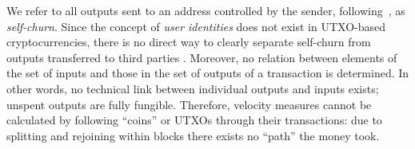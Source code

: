 We refer to all outputs sent to an address controlled by the sender,
following~\cite{kalodner2017blocksci}, as \emph{self-churn}. %
Since the concept of \textit{user identities} does not exist in UTXO-based
cryptocurrencies, there is no direct way to clearly separate self-churn from
outputs transferred to third parties \citep[cf.][]{meiklejohn2013fistful}. %
Moreover, no relation between elements of the set of inputs and those in the
set of outputs of a transaction is determined. %
In other words, no technical link between individual outputs and inputs
exists; unspent outputs are fully fungible. %
Therefore, velocity measures cannot be calculated by following ``coins'' or
UTXOs through their transactions: due to splitting and rejoining within
blocks there exists no ``path'' the money took.


